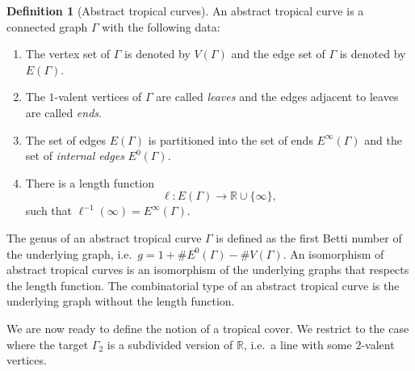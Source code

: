 \documentclass[11pt]{article}
\theoremstyle{definition}
\newtheorem{defi}[theo]{Definition}
\numberwithin{equation}{section}
\begin{document}
\begin{defi}[Abstract tropical curves]
An abstract tropical curve is a connected graph $\Gamma$ with the following data:
\begin{enumerate}
    \item The vertex set of $\Gamma$ is denoted by $V(\Gamma)$ and the edge set of $\Gamma$ is denoted by $E(\Gamma)$.
    \item The $1$-valent vertices of $\Gamma$ are called \textit{leaves} and the edges adjacent to leaves are called \textit{ends}.
    \item The set of edges $E(\Gamma)$ is partitioned into the set of ends $E^\infty(\Gamma)$ and the set of \textit{internal edges} $E^0(\Gamma)$.
    \item There is a length function
    \begin{equation*}
        \ell\colon E(\Gamma)\to\mathbb{R}\cup\{\infty\},
    \end{equation*}
    such that $\ell^{-1}(\infty)=E^\infty(\Gamma)$.
\end{enumerate}
The genus of an abstract tropical curve $\Gamma$ is defined as the first Betti number of the underlying graph, i.e.\ $g=1+\# E^0(\Gamma)-\# V(\Gamma)$. An isomorphism of abstract tropical curves is an isomorphism of the underlying graphs that respects the length function. The combinatorial type of an abstract tropical curve is the underlying graph without the length function.
\end{defi}

We are now ready to define the notion of a tropical cover. We restrict to the case where the target $\Gamma_2$ is a subdivided version of $\mathbb{R}$, i.e.\ a line with some $2$-valent vertices.
\end{document}
